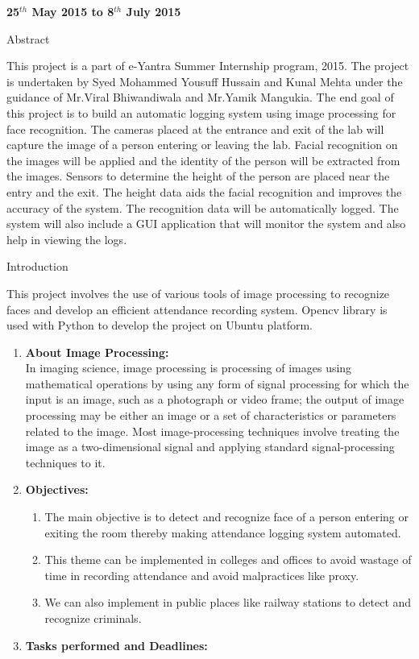 \documentclass[14pt]{article}
\begin{document}
\begin{center}
\textbf{{\LARGE 25$^{th}$ May 2015 to 8$^{th}$ July 2015}}
\end{center}
\break
\begin{center}
{\Huge Abstract}
\end{center}

{\large This project is a part of e-Yantra Summer Internship program, 2015. The project is undertaken by Syed Mohammed Yousuff Hussain and Kunal Mehta under the guidance of Mr.Viral Bhiwandiwala and Mr.Yamik Mangukia. The end goal of this project is to build an automatic logging system using image processing for face recognition. The cameras placed at the entrance and exit of the lab will capture the image of a person entering or leaving the lab. Facial recognition on the images will be applied and the identity of the person will be extracted from the images. Sensors to determine the height of the person are placed near the entry and the exit. The height data aids the facial recognition and improves the accuracy of the system. The recognition data will be automatically logged. The system will also include a GUI application that will monitor the system and also help in viewing the logs.
	}

\break
\begin{center}
{\Huge Introduction}
\end{center}
This project involves the use of various tools of image processing to recognize faces and develop an efficient attendance recording system. Opencv library is used with Python to develop the
project on Ubuntu platform.
\begin{enumerate}
	\item \textbf{{\large About Image Processing:\\}}
In imaging science, image processing is processing of images using mathematical operations by using any form of signal processing for which the input is an image, such as a photograph or video frame; the output of image processing may be either an image or a set of characteristics or parameters related to the image. Most image-processing techniques involve treating the image as a two-dimensional signal and applying standard signal-processing techniques to it.

	\item \textbf{{\large Objectives:}}
	\begin{enumerate}
	\item The main objective is to detect and recognize face of a person entering or exiting the room thereby making attendance logging system automated.
	\item This theme can be implemented in colleges and offices to avoid wastage of time in recording attendance and avoid malpractices like proxy.
	\item We can also implement in public places like railway stations to detect and recognize criminals.\\
\end{enumerate}


	\item \textbf{{\large Tasks performed and Deadlines:}}
\end{enumerate}
\end{document}
